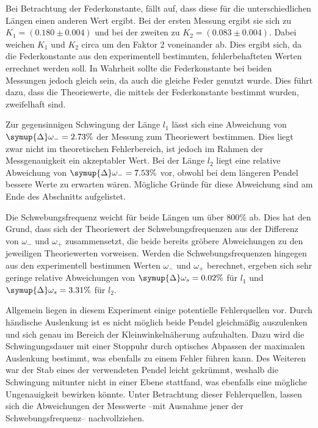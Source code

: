 Bei Betrachtung der Federkonstante, fällt auf, dass diese für die unterschiedlichen Längen einen anderen Wert ergibt. Bei der ersten Messung ergibt sie sich zu $K_1 = (0.180 ± 0.004)$ und bei
der zweiten zu $K_2 = (0.083 ± 0.004)$. Dabei weichen $K_1$ und $K_2$ circa um den Faktor 2 voneinander ab.
Dies ergibt sich, da die Federkonstante aus den experimentell
bestimmten, fehlerbehafteten Werten errechnet werden soll. In Wahrheit sollte die Federkonstante bei beiden Messungen jedoch gleich sein, da auch die gleiche Feder 
genutzt wurde. Dies führt dazu, dass die Theoriewerte, die mittels der Federkonstante bestimmt wurden, zweifelhaft sind.

Zur gegensinnigen Schwingung der Länge $l_1$ lässt sich eine Abweichung von $\symup{\Delta}\omega_{-} = 2.73\%$ der Messung zum Theoriewert bestimmen. 
Dies liegt zwar nicht im theoretischen Fehlerbereich, ist jedoch im Rahmen der Messgenauigkeit ein akzeptabler Wert.
Bei der Länge $l_2$ liegt eine relative Abweichung von $\symup{\Delta}\omega_{-} = 7.53\%$ vor, obwohl bei dem längeren Pendel bessere Werte zu erwarten wären. 
Mögliche Gründe für diese Abweichung sind am Ende des Abschnitts aufgelistet.

Die Schwebungsfrequenz weicht für beide Längen um über 800\% ab. Dies hat den Grund, dass sich der Theoriewert der Schwebungsfrequenzen aus der Differenz 
von $\omega_-$ und $\omega_+$ zusammensetzt, die beide bereits gröbere Abweichungen zu den jeweiligen Theoriewerten vorweisen. 
Werden die Schwebungsfrequenzen  hingegen aus den experimentell bestimmen Werten $\omega_-$ und $\omega_+$ berechnet, 
ergeben sich sehr geringe relative Abweichungen von $\symup{\Delta}\omega_{s} = 0.02\%$ für $l_1$ und $\symup{\Delta}\omega_{s} = 3.31\%$ für $l_2$. 

Allgemein liegen in diesem Experiment einige potentielle Fehlerquellen vor. Durch händische Auslenkung ist es nicht möglich beide Pendel gleichmäßig auszulenken und sich
genau im Bereich der Kleinwinkelnäherung aufzuhalten. Dazu wird die Schwingungsdauer mit einer Stoppuhr durch optisches Abpassen der maximalen Auslenkung bestimmt,
was ebenfalls zu einem Fehler führen kann. Des Weiteren war der Stab eines der verwendeten Pendel leicht gekrümmt, weshalb die Schwingung mitunter nicht in einer
Ebene stattfand, was ebenfalls eine mögliche Ungenauigkeit bewirken könnte.
Unter Betrachtung dieser Fehlerquellen, lassen sich die Abweichungen der Messwerte --mit Ausnahme jener der Schwebungsfrequenz-- nachvollziehen.
